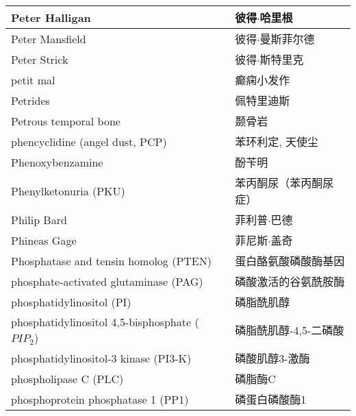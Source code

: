 \begin{longtable}{lll}
	\midrule
	Peter Halligan     && 彼得$\cdot$哈里根   \\
	
	\midrule
	Peter Mansfield     && 彼得$\cdot$曼斯菲尔德   \\
	
	\midrule
	Peter Strick     && 彼得$\cdot$斯特里克   \\
	
	\midrule
	petit mal     && 癫痫小发作   \\
	
	\midrule
	Petrides     && 佩特里迪斯   \\
	
	\midrule
	Petrous temporal bone     && 颞骨岩   \\
	
	\midrule
	phencyclidine  (angel dust, PCP)  &&  苯环利定, 天使尘   \\
	
	\midrule
	Phenoxybenzamine  &&  酚苄明   \\
	
	\midrule
	Phenylketonuria (PKU)    &&  苯丙酮尿（苯丙酮尿症）   \\
	
	\midrule
	Philip Bard     && 菲利普$\cdot$巴德   \\
	
	\midrule
	Phineas Gage     && 菲尼斯$\cdot$盖奇   \\
	
	\midrule
	Phosphatase and tensin homolog (PTEN)    && 蛋白酪氨酸磷酸酶基因   \\
	
	\midrule
	phosphate-activated glutaminase (PAG)   && 磷酸激活的谷氨酰胺酶   \\
	
	\midrule
	phosphatidylinositol (PI)    && 磷脂酰肌醇   \\
	
	\midrule
	\makecell[l]{phosphatidylinositol \\ 4,5-bisphosphate ($ PIP_2 $)}    && 磷脂酰肌醇-4,5-二磷酸   \\
	
	\midrule
	phosphatidylinositol-3 kinase (PI3-K)   && 磷酸肌醇3-激酶   \\
	
	\midrule
	phospholipase C (PLC)     && 磷脂酶C   \\
	
	\midrule
	phosphoprotein phosphatase 1 (PP1)     && 磷蛋白磷酸酶1   \\
	

\end{longtable}
